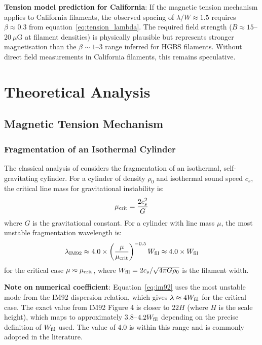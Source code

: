 \documentclass[11pt,a4paper]{article}
\begin{document}
\textbf{Tension model prediction for California}: If the magnetic tension mechanism applies to California filaments, the observed spacing of $\lambda/W \approx 1.5$ requires $\beta \approx 0.3$ from equation~\ref{eq:tension_lambda}. The required field strength ($B \approx 15$--$20~\mu$G at filament densities) is physically plausible but represents stronger magnetisation than the $\beta \sim 1$--$3$ range inferred for HGBS filaments. Without direct field measurements in California filaments, this remains speculative.

\section{Theoretical Analysis}
\label{sec:theory}

\subsection{Magnetic Tension Mechanism}

\subsubsection{Fragmentation of an Isothermal Cylinder}

The classical analysis of \citet{Inutsuka1992} considers the fragmentation of an isothermal, self-gravitating cylinder. For a cylinder of density $\rho_0$ and isothermal sound speed $c_s$, the critical line mass for gravitational instability is:
\begin{equation}
\mu_{\rm crit} = \frac{2c_s^2}{G}
\end{equation}
where $G$ is the gravitational constant. For a cylinder with line mass $\mu$, the most unstable fragmentation wavelength is:
\begin{equation}
\lambda_{\rm IM92} \approx 4.0 \times \left(\frac{\mu}{\mu_{\rm crit}}\right)^{-0.5} W_{\rm fil} \approx 4.0 \times W_{\rm fil}
\label{eq:im92}
\end{equation}
for the critical case $\mu \approx \mu_{\rm crit}$, where $W_{\rm fil} = 2c_s/\sqrt{4\pi G\rho_0}$ is the filament width.

\textbf{Note on numerical coefficient}: Equation~\ref{eq:im92} uses the most unstable mode from the IM92 dispersion relation, which gives $\lambda \approx 4W_{\rm fil}$ for the critical case. The exact value from IM92 Figure 4 is closer to $22H$ (where $H$ is the scale height), which maps to approximately 3.8--$4.2 W_{\rm fil}$ depending on the precise definition of $W_{\rm fil}$ used. The value of 4.0 is within this range and is commonly adopted in the literature.
\end{document}
